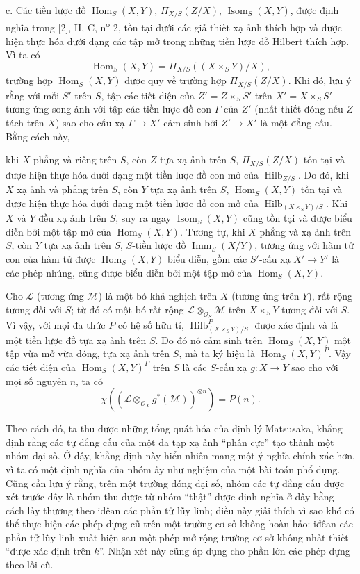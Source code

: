 \documentclass[11pt,twoside,openany]{book}
\numberwithin{equation}{section}
\newcommand{\src}[1]{%
  \phantomsection\hypertarget{src:\fgasourceid:#1}{}%
  \marginpar{\raggedleft\footnotesize\sffamily #1}%
}
\newcommand{\fgasourceid}{unset}
\begin{document}
\medskip
\noindent c. Các tiền lược đồ $\operatorname{Hom}_S(X,Y)$,
$\Pi_{X/S}(Z/X)$, $\operatorname{Isom}_S(X,Y)$, được định nghĩa trong [2], II,
C, n\textsuperscript{o} 2, tồn tại dưới các giả thiết xạ ảnh thích hợp và được
hiện thực hóa dưới dạng các tập mở trong những tiền lược đồ Hilbert thích hợp.
Vì ta có
\[
\operatorname{Hom}_S(X,Y)=\Pi_{X/S}((X\times_SY)/X),
\]
trường hợp $\operatorname{Hom}_S(X,Y)$ được quy về trường hợp
$\Pi_{X/S}(Z/X)$. Khi đó, lưu ý rằng với mỗi $S'$ trên $S$, tập các tiết diện
của $Z'=Z\times_SS'$ trên $X'=X\times_SS'$ tương ứng song ánh với tập các tiền
lược đồ con $\Gamma$ của $Z'$ (nhất thiết đóng nếu $Z$ tách trên $X$) sao cho
cấu xạ $\Gamma\longrightarrow X'$ cảm sinh bởi $Z'\longrightarrow X'$ là một
đẳng cấu. Bằng cách này,
\src{268}
khi $X$ phẳng và riêng trên $S$, còn $Z$ tựa xạ ảnh trên $S$,
$\Pi_{X/S}(Z/X)$ tồn tại và được hiện thực hóa dưới dạng một tiền lược đồ con mở của
$\operatorname{Hilb}_{Z/S}$. Do đó, khi $X$ xạ ảnh và phẳng trên $S$, còn $Y$
tựa xạ ảnh trên $S$, $\operatorname{Hom}_S(X,Y)$ tồn tại và được hiện thực hóa
dưới dạng một tiền lược đồ con mở của
$\operatorname{Hilb}_{(X\times_SY)/S}$. Khi $X$ và $Y$ đều xạ ảnh trên $S$,
suy ra ngay $\operatorname{Isom}_S(X,Y)$ cũng tồn tại và được biểu diễn bởi
một tập mở của $\operatorname{Hom}_S(X,Y)$. Tương tự, khi $X$ phẳng và xạ ảnh
trên $S$, còn $Y$ tựa xạ ảnh trên $S$, $S$-tiền lược đồ
$\operatorname{Imm}_S(X/Y)$, tương ứng với hàm tử con của hàm tử được
$\operatorname{Hom}_S(X,Y)$ biểu diễn, gồm các $S'$-cấu xạ
$X'\longrightarrow Y'$ là các phép nhúng, cũng được biểu diễn bởi một tập mở
của $\operatorname{Hom}_S(X,Y)$.

Cho $\mathcal L$ (tương ứng $\mathcal M$) là một bó khả nghịch trên $X$ (tương
ứng trên $Y$), rất rộng tương đối với $S$; từ đó có một bó rất rộng
$\mathcal L\otimes_{\mathcal O_S}\mathcal M$ trên $X\times_SY$ tương đối với
$S$. Vì vậy, với mọi đa thức $P$ có hệ số hữu tỉ,
$\operatorname{Hilb}^P_{(X\times_SY)/S}$ được xác định và là một tiền lược đồ
tựa xạ ảnh trên $S$. Do đó nó cảm sinh trên $\operatorname{Hom}_S(X,Y)$ một
tập vừa mở vừa đóng, tựa xạ ảnh trên $S$, mà ta ký hiệu là
$\operatorname{Hom}_S(X,Y)^P$. Vậy các tiết diện của
$\operatorname{Hom}_S(X,Y)^P$ trên $S$ là các $S$-cấu xạ
$g:X\longrightarrow Y$ sao cho với mọi số nguyên $n$, ta có
\[
\chi\!\left(\left(\mathcal L\otimes_{\mathcal O_X}g^*(\mathcal M)\right)^{
\otimes n}\right)=P(n).
\]

Theo cách đó, ta thu được những tổng quát hóa của định lý Matsusaka, khẳng định
rằng các tự đẳng cấu của một đa tạp xạ ảnh ``phân cực'' tạo thành một nhóm đại
số. Ở đây, khẳng định này hiển nhiên mang một ý nghĩa chính xác hơn, vì ta có
một định nghĩa của nhóm ấy như nghiệm của một bài toán phổ dụng. Cũng cần lưu ý
rằng, trên một trường đóng đại số, nhóm các tự đẳng cấu được xét trước đây là
nhóm thu được từ nhóm ``thật'' được định nghĩa ở đây bằng cách lấy thương theo
iđêan các phần tử lũy linh; điều này giải thích vì sao khó có thể thực hiện các
phép dựng cũ trên một trường cơ sở không hoàn hảo: iđêan các phần
tử lũy linh xuất hiện sau một phép mở rộng trường cơ sở không nhất thiết
``được xác định trên $k$''. Nhận xét này cũng áp dụng cho phần lớn các phép dựng
theo lối cũ.
\end{document}
